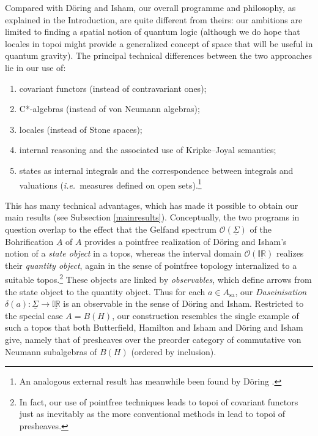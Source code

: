 \documentclass[11pt]{article}
\newcommand{\IR}{\mathbb{IR}}
\newcommand{\raw}{\rightarrow} \newcommand{\rat}{\mapsto}
\newcommand{\dl}{\delta} \newcommand{\Dl}{\Delta}
\newcommand{\CO}{{\mathcal O}} \newcommand{\CP}{{\mathcal P}}
\newcommand{\functor}[1]{\ensuremath{\underline{#1}}}
\newcommand{\sa}{\ensuremath{_{\mathrm{sa}}}}
\newcommand{\uA}{\underline{A}}
\newcommand{\ie}{\textit{i.e.}}
\newcommand{\ulS}{\functor{\Sigma}}
\begin{document}
Compared with D\"{o}ring and Isham,  our overall programme and philosophy, as explained in the Introduction, are quite different
from theirs:   our ambitions are limited to finding a spatial notion of quantum logic (although we do hope that locales in topoi might provide a generalized concept of space that will be useful in quantum gravity). The principal technical differences between the two approaches lie in
  our use of:
  \begin{enumerate}
  \item covariant functors (instead of contravariant ones);
\item  C*-algebras (instead of
von Neumann algebras);
\item
 locales (instead of Stone spaces);
\item  internal reasoning and the associated use of Kripke--Joyal semantics;
\item states as internal integrals and the correspondence between integrals and valuations (\ie\ measures defined on open sets).\footnote{An analogous external result has meanwhile been found by D\"{o}ring \cite{Doeringmeasure}.}
\end{enumerate}
 This has many technical advantages, which has made it possible to obtain our main results
(see Subsection \ref{mainresults}). 
Conceptually, the two programs in question overlap to the effect that the Gelfand spectrum
$\CO(\underline{\Sigma})$ of the Bohrification $\uA$ of $A$ provides a pointfree realization of 
D{\"o}ring and Isham's notion of a  \emph{state object} in a topos, whereas the  interval domain 
$\CO(\underline{\IR})$ realizes their \emph{quantity object}, again in the sense of  pointfree topology internalized to a suitable topos.\footnote{In fact, our use of pointfree techniques leads to topoi of covariant functors just as inevitably as the more conventional methods in
\cite{butterfieldisham1,butterfieldisham2, butterfieldisham3,doringisham1,doringisham2,doringisham3,doringisham4}
lead to topoi of presheaves.}
These objects are linked by {\it observables}, which define arrows from
the state object to the quantity object. Thus for each $a\in A\sa$, our  {\it Daseinisation} $\dl(a): \ulS\raw\underline{\IR}$ is an observable
in the sense of D\"{o}ring and Isham.  
Restricted to the special case $A=B(H)$, our construction resembles the single example
of such a topos that both  Butterfield, Hamilton and Isham \cite{butterfieldisham3} and D{\"o}ring and Isham \cite{doringisham2,doringisham3} give, namely that of presheaves over the preorder category of commutative von  Neumann subalgebras of $B(H)$ (ordered by inclusion).

{\small


}
\end{document}
